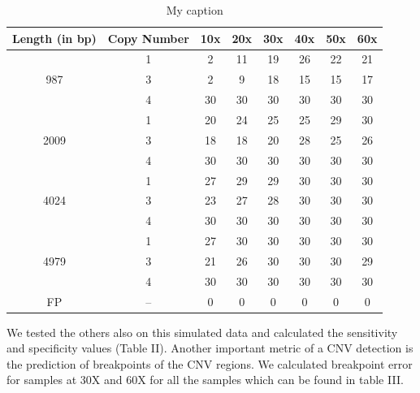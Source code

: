 \documentclass[twocolumn,oneside,conference]
{IEEEtran}
\begin{document}
\begin{table}[h]
\centering
\caption{My caption}
\label{my-label}
\begin{tabular}{|c|c|c|c|c|c|c|c|}
\hline
\textbf{Length (in bp)} & \textbf{Copy Number} & \textbf{10x} & \textbf{20x} & \textbf{30x} & \textbf{40x} & \textbf{50x} & \textbf{60x} \\ \hline
\multirow{3}{*}{987}    & 1                    & 2            & 11           & 19           & 26           & 22           & 21           \\ \cline{2-8} 
                        & 3                    & 2            & 9            & 18           & 15           & 15           & 17           \\ \cline{2-8} 
                        & 4                    & 30           & 30           & 30           & 30           & 30           & 30           \\ \hline
\multirow{3}{*}{2009}   & 1                    & 20           & 24           & 25           & 25           & 29           & 30           \\ \cline{2-8} 
                        & 3                    & 18           & 18           & 20           & 28           & 25           & 26           \\ \cline{2-8} 
                        & 4                    & 30           & 30           & 30           & 30           & 30           & 30           \\ \hline
\multirow{3}{*}{4024}   & 1                    & 27           & 29           & 29           & 30           & 30           & 30           \\ \cline{2-8} 
                        & 3                    & 23           & 27           & 28           & 30           & 30           & 30           \\ \cline{2-8} 
                        & 4                    & 30           & 30           & 30           & 30           & 30           & 30           \\ \hline
\multirow{3}{*}{4979}   & 1                    & 27           & 30           & 30           & 30           & 30           & 30           \\ \cline{2-8} 
                        & 3                    & 21           & 26           & 30           & 30           & 30           & 29           \\ \cline{2-8} 
                        & 4                    & 30           & 30           & 30           & 30           & 30           & 30           \\ \hline
FP                      & --                   & 0            & 0            & 0            & 0            & 0            & 0            \\ \hline
\end{tabular}
\end{table}
\par We tested the others also on this simulated data and calculated the sensitivity and specificity values (Table II). Another important metric of a CNV detection is the prediction of breakpoints of the CNV regions. We calculated breakpoint error for samples at 30X and 60X for all the samples which can be found in table III.  
\end{document}
